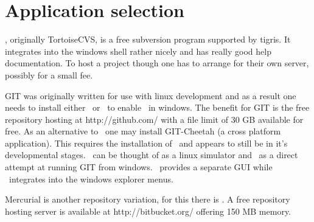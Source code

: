 \section{Application selection}

\svn, originally TortoiseCVS, is a free subversion program supported by tigris. It integrates into the windows shell rather nicely and has really good help documentation. To host a project though one has to arrange for their own server, possibly for a small fee.

GIT was originally written for use with linux development and as a result one needs to install either \cyg\ or \msys\ to enable \git\ in windows. The benefit for GIT is the free repository hosting at http://github.com/ with a file limit of 30 GB available for free. As an alternative to \git\ one may install GIT-Cheetah (a cross platform application). This requires the installation of \msys\ and appears to still be in it's developmental stages. \cyg\ can be thought of as a linux simulator and \msys\ as a direct attempt at running GIT from windows. \msys\ provides a separate GUI while \git\ integrates into the windows explorer menus.

Mercurial is another repository variation, for this there is \hg. A free repository hosting server is available at http://bitbucket.org/ offering 150 MB memory.
